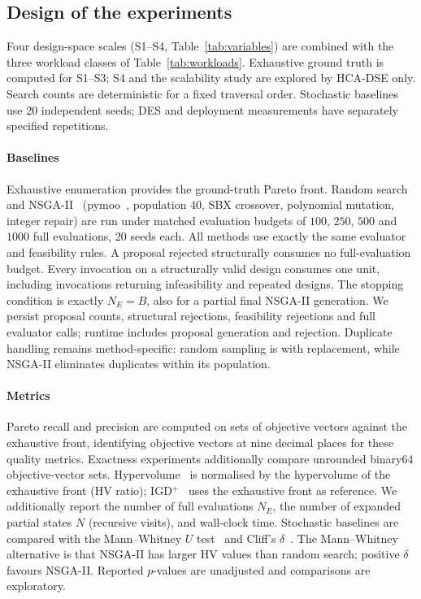 \documentclass[preprint,11pt,3p]{elsarticle}
\theoremstyle{plain}
\theoremstyle{definition}
\begin{document}
\subsection{Design of the experiments}
Four design-space scales (S1--S4, Table~\ref{tab:variables}) are combined with the three
workload classes of Table~\ref{tab:workloads}. Exhaustive ground truth is computed for
S1--S3; S4 and the scalability study are explored by HCA-DSE only. Search counts are deterministic for a fixed traversal order. Stochastic baselines use 20 independent seeds; DES and deployment measurements have separately specified repetitions.

\paragraph{Baselines}
Exhaustive enumeration provides the ground-truth Pareto front. Random search and
NSGA-II~\cite{deb2002nsga2} (pymoo~\cite{blank2020pymoo}, population 40, SBX crossover,
polynomial mutation, integer repair) are run under matched evaluation budgets of
$100$, $250$, $500$ and $1000$ full evaluations, 20 seeds each. All methods use exactly
the same evaluator and feasibility rules. A proposal rejected structurally consumes no
full-evaluation budget. Every invocation on a structurally valid design consumes one unit,
including invocations returning infeasibility and repeated designs. The stopping condition
is exactly $N_E=B$, also for a partial final NSGA-II generation. We persist proposal counts,
structural rejections, feasibility rejections and full evaluator calls; runtime includes
proposal generation and rejection. Duplicate handling remains method-specific: random
sampling is with replacement, while NSGA-II eliminates duplicates within its population.

\paragraph{Metrics}
Pareto recall and precision are computed on sets of objective vectors against the
exhaustive front, identifying objective vectors at nine decimal places for these quality metrics. Exactness experiments additionally compare unrounded binary64 objective-vector sets. Hypervolume~\cite{zitzler1999hv} is normalised by the hypervolume of the
exhaustive front (HV ratio); IGD$^{+}$~\cite{ishibuchi2015igdplus} uses the exhaustive
front as reference. We additionally report the number of full evaluations $N_E$, the
number of expanded partial states $N$ (recursive visits), and wall-clock time. Stochastic baselines are
compared with the Mann--Whitney $U$ test~\cite{mann1947whitney} and Cliff's
$\delta$~\cite{cliff1993delta}. The Mann--Whitney alternative is that
NSGA-II has larger HV values than random search; positive $\delta$ favours
NSGA-II. Reported $p$-values are unadjusted and comparisons are exploratory.
\end{document}
